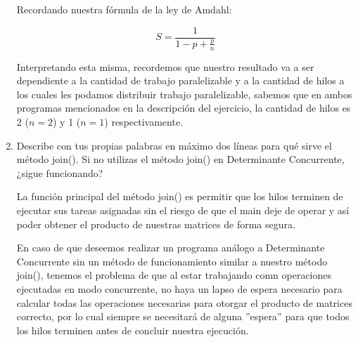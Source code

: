 \begin{enumerate}
    Recordando nuestra fórmula de la ley de Amdahl:

    \[ S = \frac{1}{1-p + \frac{p}{n}}\]

    Interpretando esta misma, recordemos que nuestro resultado va a ser dependiente a la cantidad de trabajo paralelizable y a la cantidad de hilos a los cuales les podamos distribuir trabajo paralelizable, sabemos que en ambos programas mencionados en la descripción del ejercicio, la cantidad de hilos es 2 ($n=2$) y 1 ($n=1$) respectivamente.

    \hfill    
    
    \item Describe con tus propias palabras en máximo dos líneas para qué sirve el método join(). Si no utilizas el método join() en Determinante Concurrente, ¿sigue funcionando?

    La función principal del método join() es permitir que los hilos terminen de ejecutar sus tareas asignadas sin el riesgo de que el main deje de operar y así poder obtener el producto de nuestras matrices de forma segura.
    
    En caso de que deseemos realizar un programa análogo a Determinante Concurrente sin un método de funcionamiento similar a nuestro método join(), tenemos el problema de que al estar trabajando comn operaciones ejecutadas en modo concurrente, no haya un lapso de espera necesario para calcular todas las operaciones necesarias para otorgar el producto de matrices correcto, por lo cual siempre se necesitará de alguna ''espera'' para que todos los hilos terminen antes de concluir nuestra ejecución.

    \hfill
    
\end{enumerate}
